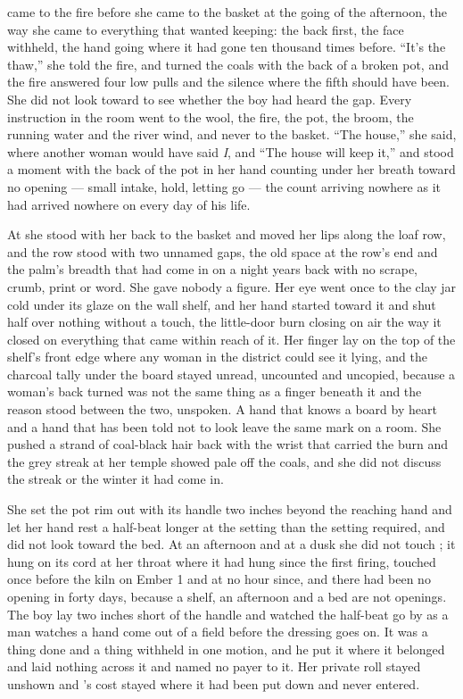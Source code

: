  came to the fire before she came to the basket at the going of the afternoon, the way she came to everything that wanted keeping: the back first, the face withheld, the hand going where it had gone ten thousand times before. “It's the thaw,” she told the fire, and turned the coals with the back of a broken pot, and the fire answered four low pulls and the silence where the fifth should have been. She did not look toward  to see whether the boy had heard the gap. Every instruction in the room went to the wool, the fire, the pot, the broom, the running water and the river wind, and never to the basket. “The house,” she said, where another woman would have said \emph{I}, and “The house will keep it,” and stood a moment with the back of the pot in her hand counting under her breath toward no opening --- small intake, hold, letting go --- the count arriving nowhere as it had arrived nowhere on every day of his life.

At  she stood with her back to the basket and moved her lips along the loaf row, and the row stood with two unnamed gaps, the old space at the row's end and the palm's breadth that had come in on a night years back with no scrape, crumb, print or word. She gave nobody a figure. Her eye went once to the clay jar cold under its glaze on the wall shelf, and her hand started toward it and shut half over nothing without a touch, the little-door burn closing on air the way it closed on everything that came within reach of it. Her finger lay on the top of the shelf's front edge where any woman in the district could see it lying, and the charcoal tally under the board stayed unread, uncounted and uncopied, because a woman's back turned was not the same thing as a finger beneath it and the reason stood between the two, unspoken. A hand that knows a board by heart and a hand that has been told not to look leave the same mark on a room. She pushed a strand of coal-black hair back with the wrist that carried the burn and the grey streak at her temple showed pale off the coals, and she did not discuss the streak or the winter it had come in.

She set the pot rim out with its handle two inches beyond the reaching hand and let her hand rest a half-beat longer at the setting than the setting required, and did not look toward the bed. At an afternoon and at a dusk she did not touch ; it hung on its cord at her throat where it had hung since the first firing, touched once before the kiln on Ember 1 and at no hour since, and there had been no opening in forty days, because a shelf, an afternoon and a bed are not openings. The boy lay two inches short of the handle and watched the half-beat go by as a man watches a hand come out of a field before the dressing goes on. It was a thing done and a thing withheld in one motion, and he put it where it belonged and laid nothing across it and named no payer to it. Her private roll stayed unshown and 's cost stayed where it had been put down and never entered.

